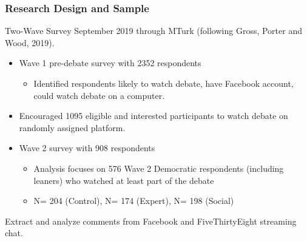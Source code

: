 \documentclass{beamer}
\begin{document}
\begin{frame}
\frametitle{Research Design and Sample}

Two-Wave Survey September 2019 through MTurk (following Gross, Porter and Wood, 2019). 

\vspace{3mm}
\begin{itemize}
    \item Wave 1 pre-debate survey with 2352 respondents
    \begin{itemize}
        \item Identified respondents likely to watch debate, have Facebook account, could watch debate on a computer.
    \end{itemize}
    
    \vspace{3mm}
    \item Encouraged 1095 eligible and interested participants to watch debate on randomly assigned platform.
    
    \vspace{3mm}
    \item Wave 2 survey with 908 respondents
      \begin{itemize}
        \item Analysis focuses on 576 Wave 2 Democratic respondents (including leaners) who watched at least part of the debate
        \item N= 204 (Control), N= 174 (Expert), N= 198 (Social)
    \end{itemize}
\end{itemize}

\vspace{3mm}
Extract and analyze comments from Facebook and FiveThirtyEight streaming chat.

\end{frame}
\end{document}
